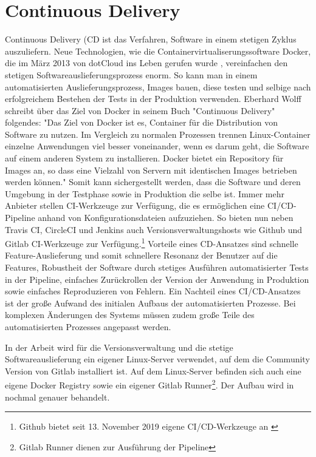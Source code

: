 \section{Continuous Delivery}
\label{sec:continuousdelivery}
Continuous Delivery (CD ist das Verfahren, Software in einem stetigen Zyklus auszuliefern.
Neue Technologien, wie die Containervirtualiserungssoftware Docker,
die im März 2013 von dotCloud ins Leben gerufen wurde \cite{DockerAbout2014}, vereinfachen
den stetigen Softwareauslieferungsprozess enorm. So kann man in einem automatisierten
Auslieferungsprozess, Images bauen, diese testen und selbige nach erfolgreichem
Bestehen der Tests in der Produktion verwenden. Eberhard Wolff schreibt über das Ziel von Docker in
seinem Buch "Continuous Delivery" folgendes: "Das Ziel von Docker ist es, Container für die
Distribution von Software zu nutzen. Im Vergleich zu normalen Prozessen trennen Linux-Container
einzelne Anwendungen viel besser voneinander, wenn es darum geht, die Software auf einem anderen
System zu installieren. Docker bietet ein Repository für Images an, so dass eine Vielzahl
von Servern mit identischen Images betrieben werden können."\cite[S. 56]{ContinuousDeliveryWolff}
Somit kann sichergestellt werden, dass die Software und deren Umgebung in der Testphase
sowie in Produktion die selbe ist. Immer mehr Anbieter stellen CI-Werkzeuge zur Verfügung,
die es ermöglichen eine CI/CD-Pipeline anhand von Konfigurationsdateien aufzuziehen. So bieten nun
neben Travis CI, CircleCI und Jenkins auch Versionsverwaltungshosts wie Github und
Gitlab CI-Werkzeuge zur Verfügung.\footnote{Github bietet seit 13. November 2019 eigene CI/CD-Werkzeuge an \cite{GithubCIToolsHeise}}
Vorteile eines CD-Ansatzes sind schnelle Feature-Auslieferung und somit schnellere Resonanz der Benutzer auf die Features,
Robustheit der Software durch stetiges Ausführen automatisierter Tests in der Pipeline, einfaches Zurückrollen
der Version der Anwendung in Produktion sowie einfaches Reproduzieren von Fehlern. Ein Nachteil eines CI/CD-Ansatzes ist
der große Aufwand des initialen Aufbaus der automatisierten Prozesse. Bei komplexen Änderungen des Systems müssen zudem
große Teile des automatisierten Prozesses angepasst werden.

In der Arbeit wird für die Versionsverwaltung und die stetige Softwareauslieferung ein eigener Linux-Server verwendet,
auf dem die Community Version von Gitlab installiert ist. Auf dem Linux-Server befinden sich auch eine eigene Docker
Registry sowie ein eigener Gitlab Runner\footnote{Gitlab Runner dienen zur Ausführung der Pipeline}. Der Aufbau
wird in  nochmal genauer behandelt. 

